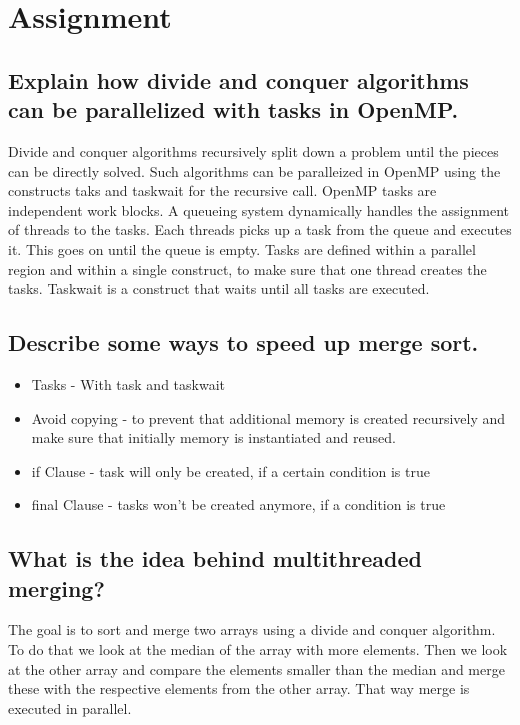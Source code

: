 \documentclass[runningheads]{llncs}
\begin{document}
\section{Assignment}

\subsection{Explain how divide and conquer algorithms can be parallelized with tasks in OpenMP.}
Divide and conquer algorithms recursively split down a problem until the pieces can be directly solved.
Such algorithms can be paralleized in OpenMP using the constructs taks and taskwait for the recursive call.
OpenMP tasks are independent work blocks. A queueing system dynamically handles the assignment of threads to the tasks. 
Each threads picks up a task from the queue and executes it. This goes on until the queue is empty. 
Tasks are defined within a parallel region and within a single construct, to make sure that one thread creates the tasks.
Taskwait is a construct that waits until all tasks are executed.

\subsection{Describe some ways to speed up merge sort.}
\begin{itemize}
	\item Tasks - With task and taskwait
	\item Avoid copying - to prevent that additional memory is created recursively and make sure that initially memory is instantiated and reused.
	\item if Clause - task will only be created, if a certain condition is true
	\item final Clause - tasks won't be created anymore, if a condition is true
\end{itemize}


\subsection{What is the idea behind multithreaded merging?}
The goal is to sort and merge two arrays using a divide and conquer algorithm. To do that we look at the median of the
array with more elements. Then we look at the other array and compare the elements smaller than the median and merge these
with the respective elements from the other array. That way merge is executed in parallel.
\end{document}
